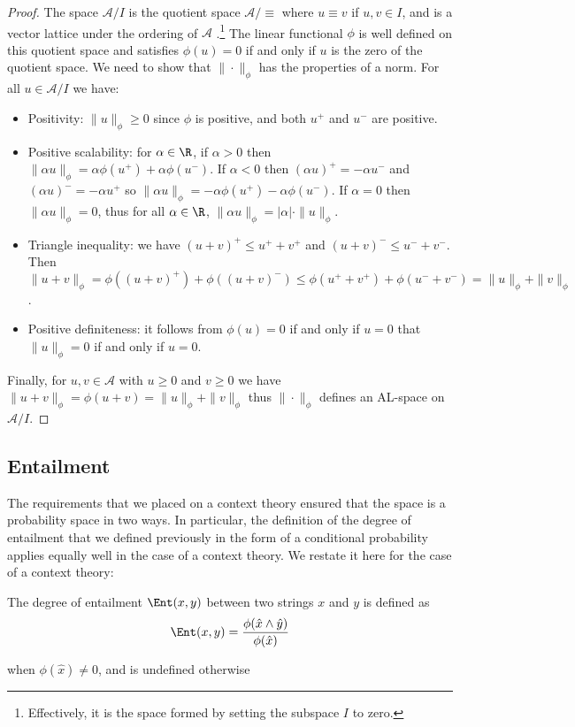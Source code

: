\begin{proof}
The space $\mathcal{A}/I$ is the quotient space $\mathcal{A}/\equiv$ where $u\equiv v$ if $u,v \in I$, and is a vector lattice under the ordering of $\mathcal{A}$ \citep{Aliprantis:85}.\footnote{Effectively, it is the space formed by setting the subspace $I$ to zero.} The linear functional $\phi$ is well defined on this quotient space and satisfies $\phi(u) = 0$ if and only if $u$ is the zero of the quotient space. We need to show that $\|\cdot\|_\phi$ has the properties of a norm. For all $u \in \mathcal{A}/I$ we have:
\begin{itemize}
\item Positivity: $\|u\|_\phi \ge 0$ since $\phi$ is positive, and both $u^+$ and $u^-$ are positive.
\item Positive scalability: for $\alpha \in \R$, if $\alpha > 0$ then $\|\alpha u\|_\phi = \alpha\phi(u^+) + \alpha\phi(u^-)$. If $\alpha < 0$ then $(\alpha u)^+ = -\alpha u^-$ and $(\alpha u)^- = -\alpha u^+$ so $\|\alpha u\|_\phi = -\alpha\phi(u^+) - \alpha\phi(u^-)$. If $\alpha = 0$ then $\|\alpha u\|_\phi = 0$, thus for all $\alpha \in \R$, $\|\alpha u\|_\phi = |\alpha| \cdot \|u\|_\phi$.
\item Triangle inequality: we have $(u+v)^+ \le u^+ + v^+$ and $(u+v)^- \le u^- + v^-$. Then $\|u+v\|_\phi = \phi((u+v)^+) + \phi((u+v)^-) \le \phi(u^+ + v^+) + \phi(u^- + v^-) = \|u\|_\phi + \|v\|_\phi$.
\item Positive definiteness: it follows from $\phi(u) = 0$ if and only if $u = 0$ that $\|u\|_\phi = 0$ if and only if $u = 0$.
\end{itemize}
Finally, for $u,v \in \mathcal{A}$ with $u \ge 0$ and $v \ge 0$ we have $\|u + v\|_\phi = \phi(u+v) = \|u\|_\phi + \|v\|_\phi$ thus $\|\cdot\|_\phi$ defines an AL-space on $\mathcal{A}/I$.
\end{proof}

\subsection{Entailment}

The requirements that we placed on a context theory ensured that the space is a probability space in two ways. In particular, the definition of the degree of entailment that we defined previously in the form of a conditional probability applies equally well in the case of a context theory. We restate it here for the case of a context theory:
\begin{defn}
The degree of entailment $\Ent(x,y)$ between two strings $x$ and $y$ is defined as
$$\Ent(x,y) = \frac{\phi(\hat{x}\land\hat{y})}{\phi(\hat{x})}$$
\end{defn}
when $\phi(\hat{x}) \neq 0$, and is undefined otherwise

